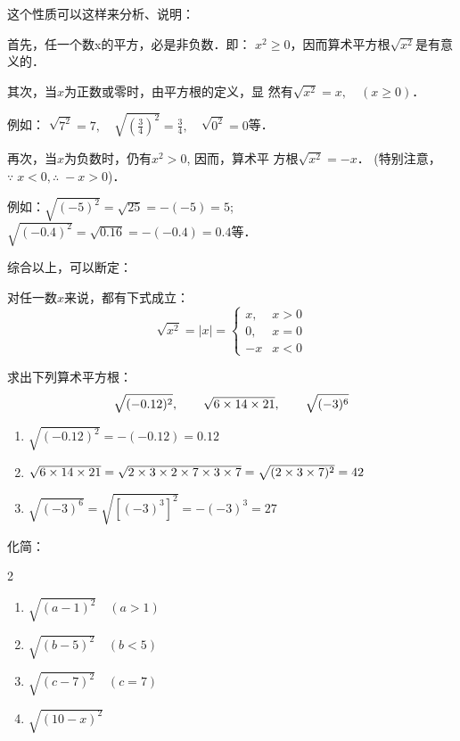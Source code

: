 这个性质可以这样来分析、说明：

首先，任一个数x的平方，必是非负数．即：
$x^2\ge 0$，因而算术平方根$\sqrt{x^2}$是有意义的．

其次，当$x$为正数或零时，由平方根的定义，显
然有$\sqrt{x^2}=x,\quad (x\ge 0)$．

例如：
$\sqrt{7^2}=7,\quad\sqrt{\left(\frac{3}{4}\right)^2}=\frac{3}{4},\quad \sqrt{0^2}=0$等．


再次，当$x$为负数时，仍有$x^2>0$, 因而，算术平
方根$\sqrt{x^2}=-x$． (特别注意，$\because\; x<0, \therefore\; -x>0$)．

例如：$\sqrt{(-5)^2}=\sqrt{25}=-(-5)=5$; 
$\sqrt{(-0.4)^2}=\sqrt{0.16}=-(-0.4)=0.4$等．

综合以上，可以断定：

对任一数$x$来说，都有下式成立：
\[\sqrt{x^2}=|x|=\begin{cases}
    x,& x>0\\
    0, &x=0\\
    -x & x<0
\end{cases}\]


\begin{example}
    求出下列算术平方根：
\[ \sqrt{(-0.12)^2},\qquad \sqrt{6\times 14\times 21},\qquad \sqrt{(-3)^6} \]
\end{example}

\begin{solution}
\begin{enumerate}
    \item $ \sqrt{(-0.12)^2}=-(-0.12)=0.12$
    \item $\sqrt{6\times 14\times 21}=\sqrt{2\times3\times2\times7\times3\times7}=\sqrt{(2\times3\times7)^2}=42$
    \item $\sqrt{(-3)^6}=\sqrt{[(-3)^3]^2}=-(-3)^3=27$
\end{enumerate}
\end{solution}

\begin{example}
    化简：
\begin{multicols}{2}
\begin{enumerate}
    \item $\sqrt{(a-1)^{2}}\quad (a>1)$
    \item $\sqrt{(b-5)^{2}}\quad (b<5)$
    \item $\sqrt{(c-7)^{2}}\quad (c=7)$
    \item $\sqrt{(10-x)^{2}}$
\end{enumerate}
\end{multicols}
\end{example}

